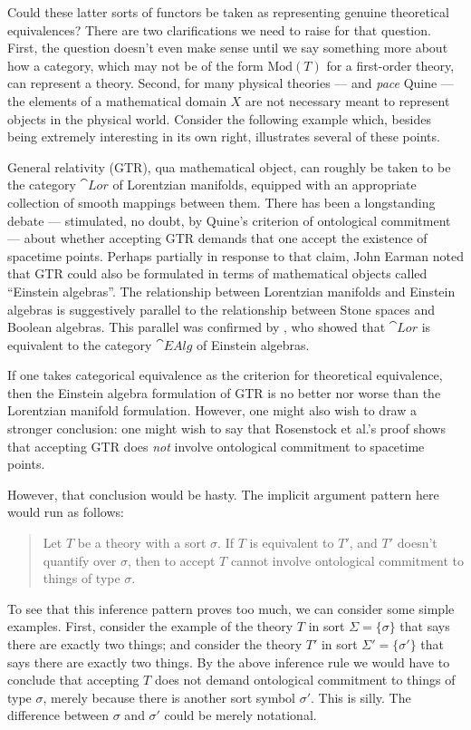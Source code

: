 Could these latter sorts of functors be taken as representing genuine
theoretical equivalences?  There are two clarifications we need to
raise for that question.  First, the question doesn't even make sense
until we say something more about how a category, which may not be of
the form $\mathrm{Mod}(T)$ for a first-order theory, can represent a
theory.  Second, for many physical theories --- and {\it pace} Quine
--- the elements of a mathematical domain $X$ are not necessary meant
to represent objects in the physical world.  Consider the following
example which, besides being extremely interesting in its own right,
illustrates several of these points.

General relativity (GTR), qua mathematical object, can roughly be
taken to be the category $\cat{Lor}$ of Lorentzian manifolds, equipped
with an appropriate collection of smooth mappings between them.  There
has been a longstanding debate --- stimulated, no doubt, by Quine's
criterion of ontological commitment --- about whether accepting GTR
demands that one accept the existence of spacetime points.  Perhaps
partially in response to that claim, John Earman noted that GTR could
also be formulated in terms of mathematical objects called ``Einstein
algebras''.  The relationship between Lorentzian manifolds and
Einstein algebras is suggestively parallel to the relationship between
Stone spaces and Boolean algebras.  This parallel was confirmed by
\cite{rosenstock}, who showed that $\cat{Lor}$ is equivalent to the
category $\cat{EAlg}$ of Einstein algebras.

If one takes categorical equivalence as the criterion for theoretical
equivalence, then the Einstein algebra formulation of GTR is no better
nor worse than the Lorentzian manifold formulation.  However, one
might also wish to draw a stronger conclusion: one might wish to say
that Rosenstock et al.'s proof shows that accepting GTR does {\it not}
involve ontological commitment to spacetime points.

However, that conclusion would be hasty.  The implicit argument
pattern here would run as follows:
\begin{quote}
  Let $T$ be a theory with a sort $\sigma$.  If $T$ is equivalent to
  $T'$, and $T'$ doesn't quantify over $\sigma$, then to accept $T$
  cannot involve ontological commitment to things of type
  $\sigma$. \end{quote} To see that this inference pattern proves too
much, we can consider some simple examples.  First, consider the
example of the theory $T$ in sort $\Sigma =\{\sigma \}$ that says
there are exactly two things; and consider the theory $T'$ in sort
$\Sigma '=\{\sigma '\}$ that says there are exactly two things.  By
the above inference rule we would have to conclude that accepting $T$
does not demand ontological commitment to things of type $\sigma$,
merely because there is another sort symbol $\sigma '$.  This is
silly.  The difference between $\sigma$ and $\sigma '$ could be merely
notational.

